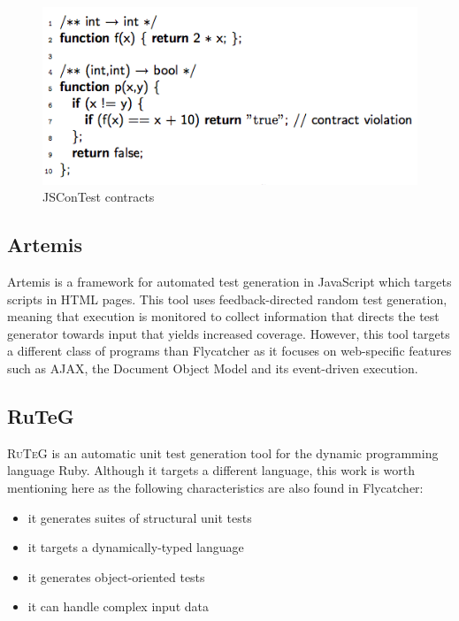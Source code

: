 \begin{figure}
\centering
\includegraphics[scale=0.5]{./components/chapter2/contracts.png}
\caption{\textsf{JSConTest} contracts}
\label{contracts}
\end{figure}

\subsection{Artemis}
\textsf{Artemis} \cite{artzi2011framework} is a framework for automated test generation in JavaScript which targets scripts in HTML pages. This tool uses feedback-directed random test generation, meaning that execution is monitored to collect information that directs the test generator towards input that yields increased coverage. However, this tool targets a different class of programs than \textsf{Flycatcher} as it focuses on web-specific features such as AJAX, the Document Object Model and its event-driven execution.

\subsection{RuTeG}
\textsc{RuTeG} \cite{mairhofer2008search} is an automatic unit test generation tool for the dynamic programming language Ruby. Although it targets a different language, this work is worth mentioning here as the following characteristics are also found in \textsf{Flycatcher}:

\begin{itemize}
   \item it generates suites of structural unit tests
   \item it targets a dynamically-typed language
   \item it generates object-oriented tests 
   \item it can handle complex input data
\end{itemize}

